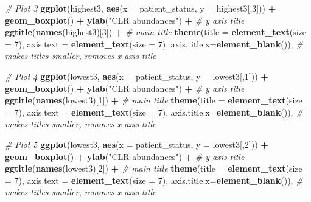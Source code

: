 \documentclass[
  oneside]{book}
\newenvironment{Shaded}{\begin{snugshade}}{\end{snugshade}}
\newcommand{\CommentTok}[1]{\textcolor[rgb]{0.56,0.35,0.01}{\textit{#1}}}
\newcommand{\DataTypeTok}[1]{\textcolor[rgb]{0.13,0.29,0.53}{#1}}
\newcommand{\DecValTok}[1]{\textcolor[rgb]{0.00,0.00,0.81}{#1}}
\newcommand{\KeywordTok}[1]{\textcolor[rgb]{0.13,0.29,0.53}{\textbf{#1}}}
\newcommand{\NormalTok}[1]{#1}
\newcommand{\OperatorTok}[1]{\textcolor[rgb]{0.81,0.36,0.00}{\textbf{#1}}}
\newcommand{\StringTok}[1]{\textcolor[rgb]{0.31,0.60,0.02}{#1}}
\begin{document}
\begin{Shaded}
\begin{Highlighting}[]
  \CommentTok{# Plot 3}
  \KeywordTok{ggplot}\NormalTok{(highest3, }\KeywordTok{aes}\NormalTok{(}\DataTypeTok{x =}\NormalTok{ patient_status, }\DataTypeTok{y =}\NormalTok{ highest3[,}\DecValTok{3}\NormalTok{])) }\OperatorTok{+}\StringTok{ }
\StringTok{    }\KeywordTok{geom_boxplot}\NormalTok{() }\OperatorTok{+}\StringTok{ }
\StringTok{    }\KeywordTok{ylab}\NormalTok{(}\StringTok{"CLR abundances"}\NormalTok{) }\OperatorTok{+}\StringTok{ }\CommentTok{# y axis title}
\StringTok{    }\KeywordTok{ggtitle}\NormalTok{(}\KeywordTok{names}\NormalTok{(highest3)[}\DecValTok{3}\NormalTok{]) }\OperatorTok{+}\StringTok{ }\CommentTok{# main title}
\StringTok{    }\KeywordTok{theme}\NormalTok{(}\DataTypeTok{title =} \KeywordTok{element_text}\NormalTok{(}\DataTypeTok{size =} \DecValTok{7}\NormalTok{),}
          \DataTypeTok{axis.text =} \KeywordTok{element_text}\NormalTok{(}\DataTypeTok{size =} \DecValTok{7}\NormalTok{),}
          \DataTypeTok{axis.title.x=}\KeywordTok{element_blank}\NormalTok{()), }\CommentTok{# makes titles smaller, removes x axis title}
  
  \CommentTok{# Plot 4}
  \KeywordTok{ggplot}\NormalTok{(lowest3, }\KeywordTok{aes}\NormalTok{(}\DataTypeTok{x =}\NormalTok{ patient_status, }\DataTypeTok{y =}\NormalTok{ lowest3[,}\DecValTok{1}\NormalTok{])) }\OperatorTok{+}\StringTok{ }
\StringTok{    }\KeywordTok{geom_boxplot}\NormalTok{() }\OperatorTok{+}\StringTok{ }
\StringTok{    }\KeywordTok{ylab}\NormalTok{(}\StringTok{"CLR abundances"}\NormalTok{) }\OperatorTok{+}\StringTok{ }\CommentTok{# y axis title}
\StringTok{    }\KeywordTok{ggtitle}\NormalTok{(}\KeywordTok{names}\NormalTok{(lowest3)[}\DecValTok{1}\NormalTok{]) }\OperatorTok{+}\StringTok{ }\CommentTok{# main title}
\StringTok{    }\KeywordTok{theme}\NormalTok{(}\DataTypeTok{title =} \KeywordTok{element_text}\NormalTok{(}\DataTypeTok{size =} \DecValTok{7}\NormalTok{),}
          \DataTypeTok{axis.text =} \KeywordTok{element_text}\NormalTok{(}\DataTypeTok{size =} \DecValTok{7}\NormalTok{),}
          \DataTypeTok{axis.title.x=}\KeywordTok{element_blank}\NormalTok{()), }\CommentTok{# makes titles smaller, removes x axis title}
  
  \CommentTok{# Plot 5}
  \KeywordTok{ggplot}\NormalTok{(lowest3, }\KeywordTok{aes}\NormalTok{(}\DataTypeTok{x =}\NormalTok{ patient_status, }\DataTypeTok{y =}\NormalTok{ lowest3[,}\DecValTok{2}\NormalTok{])) }\OperatorTok{+}\StringTok{ }
\StringTok{    }\KeywordTok{geom_boxplot}\NormalTok{() }\OperatorTok{+}\StringTok{ }
\StringTok{    }\KeywordTok{ylab}\NormalTok{(}\StringTok{"CLR abundances"}\NormalTok{) }\OperatorTok{+}\StringTok{ }\CommentTok{# y axis title}
\StringTok{    }\KeywordTok{ggtitle}\NormalTok{(}\KeywordTok{names}\NormalTok{(lowest3)[}\DecValTok{2}\NormalTok{]) }\OperatorTok{+}\StringTok{ }\CommentTok{# main title}
\StringTok{    }\KeywordTok{theme}\NormalTok{(}\DataTypeTok{title =} \KeywordTok{element_text}\NormalTok{(}\DataTypeTok{size =} \DecValTok{7}\NormalTok{),}
          \DataTypeTok{axis.text =} \KeywordTok{element_text}\NormalTok{(}\DataTypeTok{size =} \DecValTok{7}\NormalTok{),}
          \DataTypeTok{axis.title.x=}\KeywordTok{element_blank}\NormalTok{()), }\CommentTok{# makes titles smaller, removes x axis title}
  

\end{Highlighting}
\end{Shaded}
\end{document}
